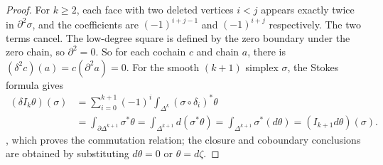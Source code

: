 \documentclass[12pt,a4paper,openany,notitlepage]{report}
\theoremstyle{plain}
\theoremstyle{definition}
\theoremstyle{remark}
\begin{document}
\begin{CJK*}
\begin{proof}
For $k\ge2$, each face with two deleted vertices $i<j$ appears exactly twice in $\partial^2\sigma$, and the coefficients are $(-1)^{i+j-1}$ and $(-1)^{i+j}$ respectively. The two terms cancel. The low-degree square is defined by the zero boundary under the zero chain, so $\partial^2=0$. So for each cochain $c$ and chain $a$, there is $(\delta^2c)(a)=c(\partial^2a)=0$. For the smooth $(k+1)$ simplex $\sigma$, the Stokes formula gives \[
\begin{aligned}
(\delta I_k\theta)(\sigma)
&=\sum_{i=0}^{k+1}(-1)^i
\int_{\Delta^k}(\sigma\circ\delta_i)^*\theta\\
&=\int_{\partial\Delta^{k+1}}\sigma^*\theta
=\int_{\Delta^{k+1}}d(\sigma^*\theta)
=\int_{\Delta^{k+1}}\sigma^*(d\theta)
=(I_{k+1}d\theta)(\sigma).
\end{aligned}
\], which proves the commutation relation; the closure and coboundary conclusions are obtained by substituting $d\theta=0$ or $\theta=d\zeta$.\end{proof}



\end{CJK*}
\end{document}
